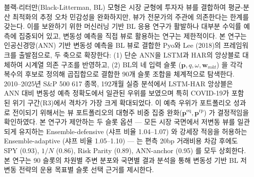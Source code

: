 \documentclass[eng]{kjas3}
\begin{document}
\begin{habstract}
블랙-리터만(Black-Litterman, BL) 모형은 시장 균형에 투자자 뷰를 결합하여 평균-분산 최적화의 추정 오차 민감성을 완화하지만, 뷰가 전문가의 주관에 의존한다는 한계를 갖는다. 이를 보완하기 위한 머신러닝 기반 BL 응용 연구가 활발하나 대부분 수익률 예측에 집중되어 있고, 변동성 예측을 직접 뷰로 활용하는 연구는 제한적이다. 본 연구는 인공신경망(ANN) 기반 변동성 예측을 BL 뷰로 결합한 Pyo와 Lee (2018)의 프레임워크를 출발점으로, 두 축으로 확장한다: (1) 단순 ANN을 LSTM과 HAR의 앙상블로 대체하여 시계열 의존 구조를 반영하고, (2) BL의 네 입력 슬롯 ($\mathbf{p}, q, \omega, \mathbf{w}_{mkt}$) 을 각각 복수의 후보로 정의해 곱집합으로 결합한 90개 슬롯 조합을 체계적으로 탐색한다. 2010--2025년 S\&P 500 617 종목, 192개월 실증 분석에서 LSTM-HAR 앙상블은 ANN 대비 변동성 예측 정확도에서 일관된 우위를 보였으며 특히 COVID-19가 포함된 위기 구간(R3)에서 격차가 가장 크게 확대되었다. 이 예측 우위가 포트폴리오 성과로 전이되기 위해서는 뷰 포트폴리오의 대형주 비중 집중 완화($\mathbf{p}^{\mathrm{eq}}, \mathbf{p}^{\mathrm{rp}}$) 가 결정적임을 확인하였다. 본 연구가 제안하는 두 슬롯 옵션 --- 모든 시장 국면에서 저변동 뷰를 일관되게 유지하는 Ensemble-defensive (샤프 비율 1.04--1.07) 와 강세장 적응을 허용하는 Ensemble-adaptive (샤프 비율 1.05--1.10) --- 는 편측 20bp 거래비용 차감 후에도 SPY (0.93), $1/N$ (0.86), Risk Parity (0.89), ANN-anchor (0.95) 를 모두 상회한다. 본 연구는 90 슬롯의 차원별 주변 분포와 국면별 결과 분석을 통해 변동성 기반 BL 저변동 전략의 운용 목표별 슬롯 선택 근거를 제시한다.
\end{habstract}

\end{document}

